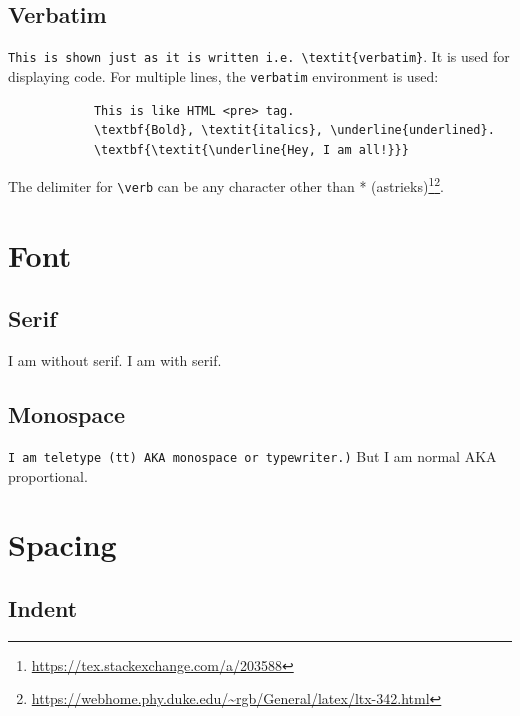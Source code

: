 	\subsection{Verbatim}
	
		\verb|This is shown just as it is written i.e. \textit{verbatim}|. It is used for displaying code. For multiple lines, the \verb|verbatim| environment is used:
		
		\begin{verbatim}
			This is like HTML <pre> tag.
			\textbf{Bold}, \textit{italics}, \underline{underlined}. 
			\textbf{\textit{\underline{Hey, I am all!}}}
		\end{verbatim}


		The delimiter for \verb|\verb| can be any character other than * (astrieks)\footnote{\url{https://tex.stackexchange.com/a/203588}}\footnote{\url{https://webhome.phy.duke.edu/~rgb/General/latex/ltx-342.html}}.

\section{Font}

	\subsection{Serif}
	
		\textsf{I am without serif.} \textrm{I am with serif.}
		
	\subsection{Monospace}
	
		\texttt{I am teletype (tt) AKA monospace or typewriter.)} \textnormal{But I am normal AKA proportional.}

%	
		
\section{Spacing}

	\subsection{Indent}
	
